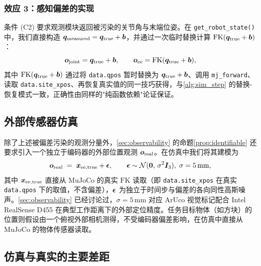 \subsubsection*{效应 3：感知偏差的实现}\label{subsec:sim_effect3}

条件 (C2) 要求观测模块返回被污染的关节角与末端位姿。在 \texttt{get\_robot\_state()} 中，我们直接构造 $\bm{q}_{\text{measured}} = \bm{q}_{\text{true}} + \bm{b}$，并通过一次临时替换计算 $\text{FK}(\bm{q}_{\text{true}} + \bm{b})$：
\begin{equation}
  \bm{o}_{\text{joint}} = \bm{q}_{\text{true}} + \bm{b}, \qquad
  \bm{o}_{\text{ee}} = \text{FK}(\bm{q}_{\text{true}} + \bm{b}),
  \label{eq:sim_obs}
\end{equation}
其中 $\text{FK}(\bm{q}_{\text{true}} + \bm{b})$ 通过将 \texttt{data.qpos} 暂时替换为 $\bm{q}_{\text{true}} + \bm{b}$、调用 \texttt{mj\_forward}、读取 \texttt{data.site\_xpos}、再恢复真实值的同一技巧获得，与\cref{alg:sim_step} 的替换-恢复模式一致，正确性由同样的"纯函数依赖"论证保证。

\subsection{外部传感器仿真}\label{subsec:sim_external}

除了上述被偏差污染的观测分量外，\cref{sec:observability} 的命题\ref{prop:identifiable} 还要求引入一个独立于编码器的外部位置观测 $\bm{o}_{\text{real}}$。在仿真中我们将其建模为
\begin{equation}
  \bm{o}_{\text{real}} \;=\; \bm{x}_{\text{ee,true}} + \bm{\epsilon},
  \qquad \bm{\epsilon} \sim \mathcal{N}(\bm{0},\,\sigma^2 \bm{I}_3),\; \sigma = 5\,\text{mm},
  \label{eq:sim_real_tcp}
\end{equation}
其中 $\bm{x}_{\text{ee,true}}$ 直接从 MuJoCo 的真实 $\text{FK}$ 读取（即 \texttt{data.site\_xpos} 在真实 \texttt{data.qpos} 下的取值，不含偏差），$\bm{\epsilon}$ 为独立于时间步与偏差的各向同性高斯噪声。\cref{sec:observability} 已经讨论过，$\sigma = 5$\,mm 对应 ArUco 视觉标记配合 Intel RealSense D455 在典型工作距离下的外部定位精度。任务目标物体（如方块）的位置则假设由一个俯视外部相机测得，不受编码器偏差影响，在仿真中直接从 MuJoCo 的物体传感器读取。

\subsection{仿真与真实的主要差距}\label{subsec:sim_real_gap}

